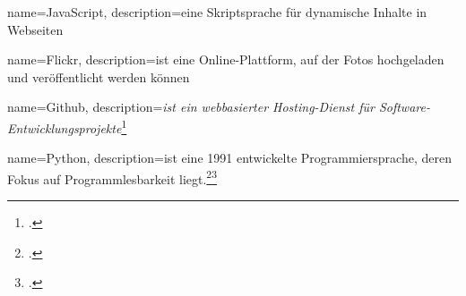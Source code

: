 
{
  name=JavaScript,
  description={eine Skriptsprache für dynamische Inhalte in Webseiten}
}

{
  name=Flickr,
  description={ist eine Online-Plattform, auf der Fotos hochgeladen und veröffentlicht werden können}
}

{
  name=Github,
  description={\emph{ist ein webbasierter Hosting-Dienst für Software-Entwicklungsprojekte}\footcite{wiki:github}}
}

{
  name=Python,
  description={ist eine 1991 entwickelte Programmiersprache, deren Fokus auf Programmlesbarkeit liegt.\footcite{python}\footcite{python_manual}{}}
}
